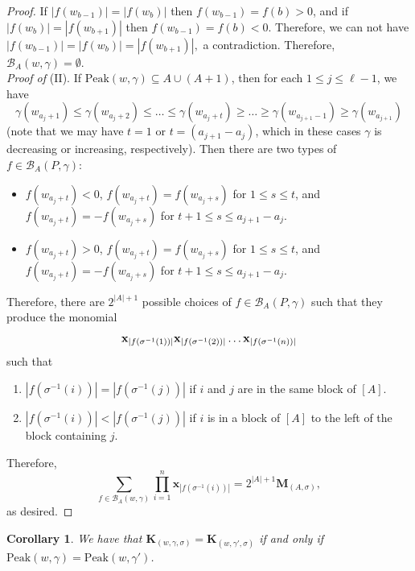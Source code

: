 \documentclass[11pt]{amsart}
\newtheorem{Corollary}[Theorem]{Corollary}
\numberwithin{equation}{section}
\newcommand{\peak}{\mathrm{Peak}}
\newcommand{\bx}{{\bf x}}
\newcommand{\bfM}{{\mathbf{M}}}
\newcommand{\calB}{{\mathcal{B}}}
\begin{document}
\begin{proof}
If  $|f(w_{b-1})|=|f(w_b)|$ then $f(w_{b-1})=f(b)>0$, and if $|f(w_{b})|=|f(w_{b+1})|$ then $f(w_{b-1})=f(b)<0$. Therefore, we can not have $|f(w_{b-1})|=|f(w_b)|=|f(w_{b+1})|,$ a contradiction. 
Therefore, $ \calB_A(w,\gamma)=\emptyset$.\\

{\it Proof of }(II). If $\peak(w,\gamma)\subseteq A\cup (A+1)$, then for each $1\leq j\leq \ell-1$, we have
 $$\gamma(w_{a_{j}+1})\leq \gamma(w_{a_{j}+2})\leq \dots\leq \gamma(w_{a_{j}+t})\geq \dots \geq\gamma(w_{a_{j+1}-1})\geq\gamma(w_{a_{j+1}})$$ (note that we may have $t=1$ or $t=(a_{j+1}-a_j)$, which in these cases $\gamma$ is decreasing or increasing, respectively).
 Then there are two types of $f\in \calB_A(P,\gamma)$: 
 \begin{itemize}
 \item $f(w_{a_j+t})<0$, $f(w_{a_j+t})=f(w_{a_j+s})$ for $1\leq s\leq t$, and $f(w_{a_j+t})=-f(w_{a_j+s})$ for $t+1\leq s\leq a_{j+1}-a_j$.
  \item $f(w_{a_j+t})>0$, $f(w_{a_j+t})=f(w_{a_j+s})$ for $1\leq s\leq t$, and $f(w_{a_j+t})=-f(w_{a_j+s})$ for $t+1\leq s\leq a_{j+1}-a_j$.
 \end{itemize} 
 Therefore, there are $2^{|A|+1}$ possible choices of $f\in \calB_{A}(P,\gamma)$ such that they produce the monomial 
 $$\bx_{|f(\sigma^{-1}(1))|}\bx_{|f(\sigma^{-1}(2))|}\dots \bx_{|f(\sigma^{-1}(n))|}$$ such that 
 \begin{enumerate}
\item $|f(\sigma^{-1}(i))|=|f(\sigma^{-1}(j))|$ if $i$ and $j$ are in the same block of $[A]$. 
\item $|f(\sigma^{-1}(i))|<|f(\sigma^{-1}(j))|$ if $i$ is in a block of $[A]$ to the left of the block containing $j$.
\end{enumerate} 
Therefore, $$\sum_{f\in\mathcal{B}_A(w,\gamma)}\prod_{i=1}^n\mathbf{x}_{|f(\sigma^{-1}(i))|}=2^{|A|+1}\bfM_{(A,\sigma)},$$ as desired.
\end{proof}



\begin{Corollary}\label{Coro:PeakSigma} We have that 
$\mathbf{K}_{(w,\gamma,\sigma)}=\mathbf{K}_{(w,\gamma',\sigma)}$ if and only if $\peak(w,\gamma)=\peak(w,\gamma')$.
	
	\end{Corollary} 
\end{document}

